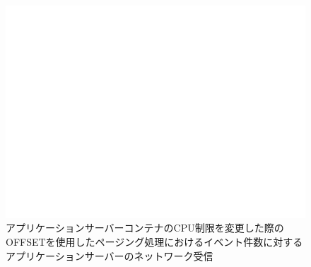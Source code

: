 \documentclass[../../../../../main]{subfiles}
\begin{document}
    \begin{figure}[H]
        \centering
        \includegraphics[width=12cm]{graph}
        \caption{アプリケーションサーバーコンテナのCPU制限を変更した際のOFFSETを使用したページング処理におけるイベント件数に対するアプリケーションサーバーのネットワーク受信}
        \label{fig:paging-offset-change-app-cpu-limit-app-net-in-app_1024-db_1_1024}
    \end{figure}
\end{document}
